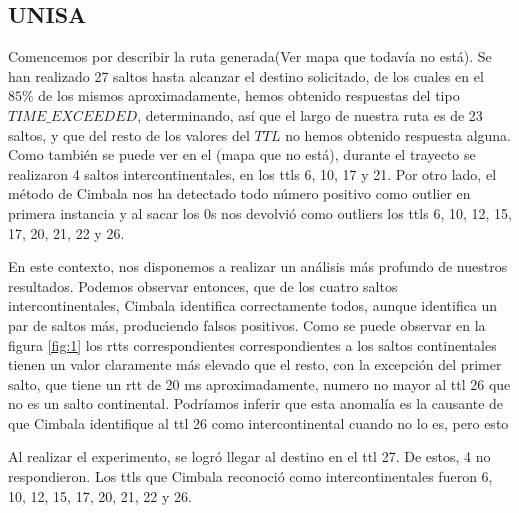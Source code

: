 \subsection{UNISA}


Comencemos por describir la ruta generada(Ver mapa que todavía no está). Se han realizado 27 saltos hasta alcanzar el destino solicitado, de los cuales en el $85 \% $ de los mismos aproximadamente, hemos obtenido respuestas del tipo $TIME\_EXCEEDED$, determinando, así que el largo de nuestra ruta es de 23 saltos, y que del resto de los valores del $TTL$ no hemos obtenido respuesta alguna. Como también se puede ver en el (mapa que no está), durante el trayecto se realizaron 4 saltos intercontinentales, en los ttls 6, 10, 17 y 21. Por otro lado, el método de Cimbala nos ha detectado todo número positivo como outlier en primera instancia y al sacar los 0s nos devolvió como outliers los ttls 6, 10, 12, 15, 17, 20, 21, 22 y 26.

En este contexto, nos disponemos a realizar un análisis más profundo de nuestros resultados. Podemos observar entonces, que de los cuatro saltos intercontinentales, Cimbala identifica correctamente todos, aunque identifica un par de saltos más, produciendo falsos positivos. Como se puede observar en la figura \ref{fig:1} los rtts correspondientes correspondientes a los saltos continentales tienen un valor claramente más elevado que el resto, con la excepción del primer salto, que tiene un rtt de 20 ms aproximadamente, numero no mayor al ttl 26 que no es un salto continental. Podríamos inferir que esta anomalía es la causante de que Cimbala identifique al ttl 26 como intercontinental cuando no lo es, pero esto

Al realizar el experimento, se logró llegar al destino en el ttl 27. De estos, 4 no respondieron. Los ttls que Cimbala reconoció como intercontinentales fueron 6, 10, 12, 15, 17, 20, 21, 22 y 26.

